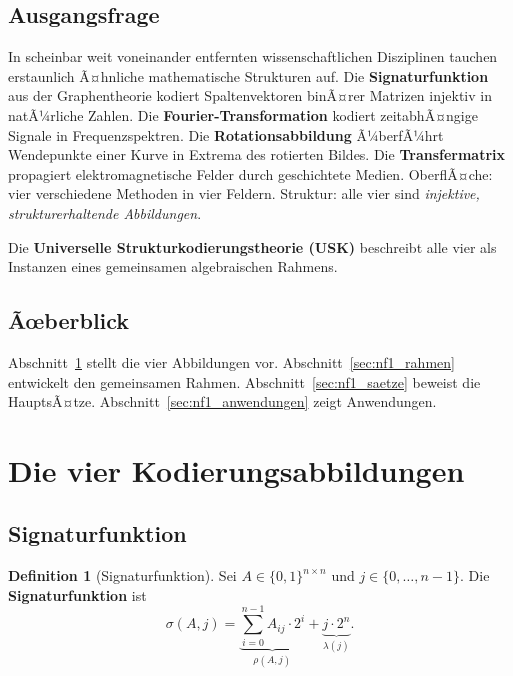﻿\documentclass[a4paper,12pt]{scrreprt}
\theoremstyle{definition}
\newtheorem{definition}{Definition}[section]
\begin{document}
\subsection{Ausgangsfrage}

In scheinbar weit voneinander entfernten wissenschaftlichen Disziplinen
tauchen erstaunlich Ã¤hnliche mathematische Strukturen auf. Die
\textbf{Signaturfunktion} aus der Graphentheorie kodiert Spaltenvektoren
binÃ¤rer Matrizen injektiv in natÃ¼rliche Zahlen. Die
\textbf{Fourier-Transformation} kodiert zeitabhÃ¤ngige Signale in
Frequenzspektren. Die \textbf{Rotationsabbildung} Ã¼berfÃ¼hrt Wendepunkte
einer Kurve in Extrema des rotierten Bildes. Die
\textbf{Transfermatrix} propagiert elektromagnetische Felder durch
geschichtete Medien. OberflÃ¤che: vier verschiedene Methoden in vier
Feldern. Struktur: alle vier sind \emph{injektive, strukturerhaltende
Abbildungen}.

Die \textbf{Universelle Strukturkodierungstheorie (USK)} beschreibt alle
vier als Instanzen eines gemeinsamen algebraischen Rahmens.

\subsection{Ãœberblick}

Abschnitt~\ref{sec:nf1_vier} stellt die vier Abbildungen vor.
Abschnitt~\ref{sec:nf1_rahmen} entwickelt den gemeinsamen Rahmen.
Abschnitt~\ref{sec:nf1_saetze} beweist die HauptsÃ¤tze.
Abschnitt~\ref{sec:nf1_anwendungen} zeigt Anwendungen.

\section{Die vier Kodierungsabbildungen}
\label{sec:nf1_vier}

\subsection{Signaturfunktion}

\begin{definition}[Signaturfunktion]
  Sei $A \in \{0,1\}^{n \times n}$ und $j \in \{0,\ldots,n-1\}$. Die
  \textbf{Signaturfunktion} ist
  \[
    \sigma(A, j) = \underbrace{\sum_{i=0}^{n-1} A_{ij} \cdot 2^i}_{\rho(A,j)}
    + \underbrace{j \cdot 2^n}_{\lambda(j)}.
  \]
\end{definition}
\end{document}
